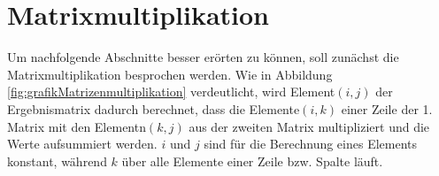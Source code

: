 \section{Matrixmultiplikation}\label{sec:Matrixmultiplikation}

% 
% 
% 
 
 


Um nachfolgende Abschnitte besser erörten zu können, soll zunächst die Matrixmultiplikation besprochen werden.
Wie in Abbildung \ref{fig:grafikMatrizenmultiplikation} verdeutlicht, wird Element$(i,j)$ der Ergebnismatrix dadurch berechnet, dass die Elemente$(i,k)$ einer Zeile der 1. Matrix
mit den Elementn$(k,j)$ aus der zweiten Matrix multipliziert und die Werte aufsummiert werden. $i$ und $j$ sind für die Berechnung eines Elements konstant, während $k$ über alle
Elemente einer Zeile bzw. Spalte läuft.


